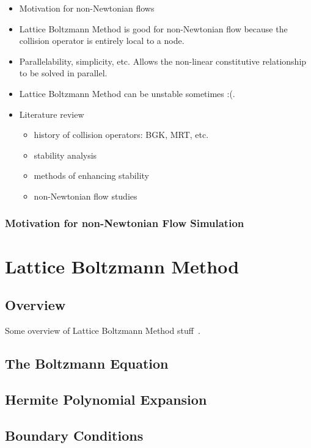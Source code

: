\documentclass{article}
\begin{document}
\begin{itemize}
	\item Motivation for non-Newtonian flows
	\item Lattice Boltzmann Method is good for non-Newtonian flow because the collision operator is entirely local to a node.
	\item Parallelability, simplicity, etc. Allows the non-linear constitutive relationship to be solved in parallel.
	\item Lattice Boltzmann Method can be unstable sometimes :(.
	\item Literature review
	\begin{itemize}
		\item history of collision operators: BGK, MRT, etc.
		\item stability analysis
		\item methods of enhancing stability
		\item non-Newtonian flow studies
	\end{itemize}
\end{itemize}

\subsubsection{Motivation for non-Newtonian Flow Simulation}



\section{Lattice Boltzmann Method}

\subsection{Overview}

Some overview of Lattice Boltzmann Method stuff~\cite{grasinger2015simulation}.

\subsection{The Boltzmann Equation}

\subsection{Hermite Polynomial Expansion}

\subsection{Boundary Conditions}
\end{document}
